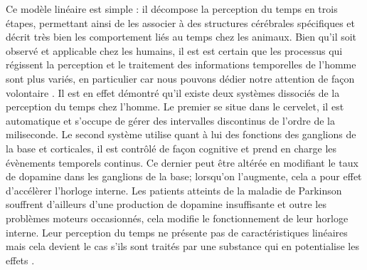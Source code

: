 \documentclass[12pt,fleqn,oneside,openany]{book} %
\begin{document}
Ce modèle linéaire est simple : il décompose la perception du temps en trois étapes, permettant ainsi de les associer à des structures cérébrales spécifiques et décrit très bien les comportement liés au temps chez les animaux. Bien qu'il soit observé et applicable chez les humains, il est est certain que les processus qui régissent la perception et le traitement des informations temporelles de l'homme sont plus variés, en particulier car nous pouvons dédier notre attention de façon volontaire \cite{set}. Il est en effet démontré qu'il existe deux systèmes dissociés de la perception du temps chez l'homme. Le premier se situe dans le cervelet, il est automatique et s'occupe de gérer des intervalles discontinus de l'ordre de la miliseconde. Le second système utilise quant à lui des fonctions des ganglions de la base et corticales, il est contrôlé de façon cognitive et prend en charge les évènements temporels continus. Ce dernier peut être altérée en modifiant le taux de dopamine dans les ganglions de la base; lorsqu'on l'augmente, cela a pour effet d'accélèrer l'horloge interne. Les patients atteints de la maladie de Parkinson souffrent d'ailleurs d'une production de dopamine insuffisante et outre les problèmes moteurs occasionnés, cela modifie le fonctionnement de leur horloge interne. Leur perception du temps ne présente pas de caractéristiques linéaires mais cela devient le cas s'ils sont traités par une substance qui en potentialise les effets \cite{buhusi2005}. 	





\end{document}
